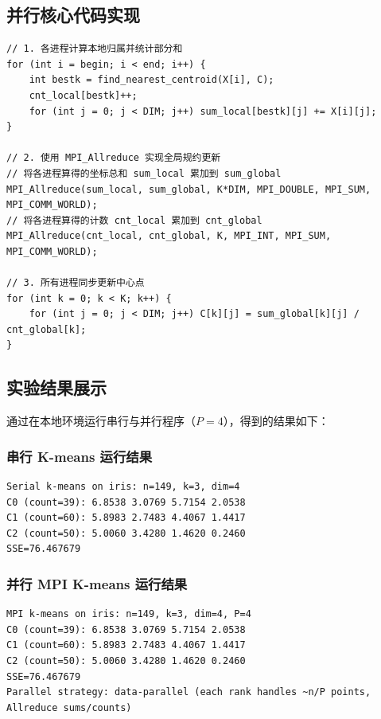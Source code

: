 \documentclass[11pt,a4paper]{article}
\begin{document}
\subsection{并行核心代码实现}
\begin{lstlisting}[caption={并行 K-means 数据规约逻辑 (mpikmeans.c)}]
// 1. 各进程计算本地归属并统计部分和
for (int i = begin; i < end; i++) {
    int bestk = find_nearest_centroid(X[i], C);
    cnt_local[bestk]++;
    for (int j = 0; j < DIM; j++) sum_local[bestk][j] += X[i][j];
}

// 2. 使用 MPI_Allreduce 实现全局规约更新
// 将各进程算得的坐标总和 sum_local 累加到 sum_global
MPI_Allreduce(sum_local, sum_global, K*DIM, MPI_DOUBLE, MPI_SUM, MPI_COMM_WORLD);
// 将各进程算得的计数 cnt_local 累加到 cnt_global
MPI_Allreduce(cnt_local, cnt_global, K, MPI_INT, MPI_SUM, MPI_COMM_WORLD);

// 3. 所有进程同步更新中心点
for (int k = 0; k < K; k++) {
    for (int j = 0; j < DIM; j++) C[k][j] = sum_global[k][j] / cnt_global[k];
}
\end{lstlisting}

\subsection{实验结果展示}
通过在本地环境运行串行与并行程序（$P=4$），得到的结果如下：

\subsubsection{串行 K-means 运行结果}
\begin{lstlisting}[backgroundcolor=\color{backcolour}]
Serial k-means on iris: n=149, k=3, dim=4
C0 (count=39): 6.8538 3.0769 5.7154 2.0538
C1 (count=60): 5.8983 2.7483 4.4067 1.4417
C2 (count=50): 5.0060 3.4280 1.4620 0.2460
SSE=76.467679
\end{lstlisting}

\subsubsection{并行 MPI K-means 运行结果}
\begin{lstlisting}[backgroundcolor=\color{backcolour}]
MPI k-means on iris: n=149, k=3, dim=4, P=4
C0 (count=39): 6.8538 3.0769 5.7154 2.0538
C1 (count=60): 5.8983 2.7483 4.4067 1.4417
C2 (count=50): 5.0060 3.4280 1.4620 0.2460
SSE=76.467679
Parallel strategy: data-parallel (each rank handles ~n/P points, Allreduce sums/counts)
\end{lstlisting}
\end{document}
